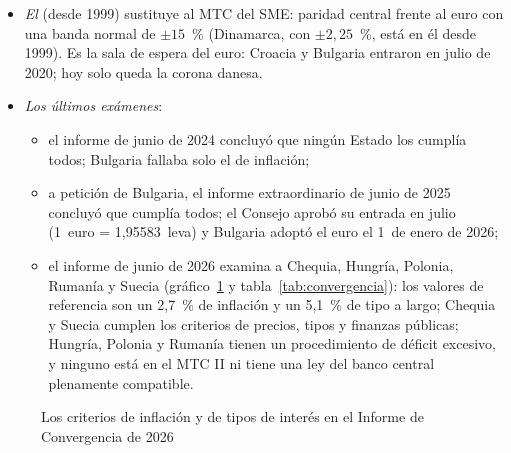 \documentclass[11pt]{article}
\begin{document}
\begin{itemize}
\item \emph{El } (desde 1999) sustituye al MTC del SME: paridad central frente al euro con una banda normal de $\pm15$~\% (Dinamarca, con $\pm2{,}25$~\%, está en él desde 1999). Es la sala de espera del euro: Croacia y Bulgaria entraron en julio de 2020; hoy solo queda la corona danesa\nocite{SuomenPankki2026MTC}.
\item \emph{Los últimos exámenes}\nocite{BCE2024Convergencia,BCE2025Convergencia,BCE2026Convergencia}:
  \begin{itemize}
  \item el informe de junio de 2024 concluyó que ningún Estado los cumplía todos; Bulgaria fallaba solo el de inflación\nocite{BCE2024Convergencia};
  \item a petición de Bulgaria, el informe extraordinario de junio de 2025 concluyó que cumplía todos; el Consejo aprobó su entrada en julio (1~euro = 1,95583~leva) y Bulgaria adoptó el euro el 1~de enero de 2026\nocite{UE2025DecisionBulgaria,UE2025ReglamentoBulgaria};
  \item el informe de junio de 2026 examina a Chequia, Hungría, Polonia, Rumanía y Suecia (gráfico~\ref{fig:convergencia} y tabla~\ref{tab:convergencia}): los valores de referencia son un 2,7~\% de inflación y un 5,1~\% de tipo a largo; Chequia y Suecia cumplen los criterios de precios, tipos y finanzas públicas; Hungría, Polonia y Rumanía tienen un procedimiento de déficit excesivo, y ninguno está en el MTC II ni tiene una ley del banco central plenamente compatible\nocite{BCE2026Convergencia}.
  \end{itemize}
\end{itemize}

\begin{figure}[H]
\centering
\caption{Los criterios de inflación y de tipos de interés en el Informe de Convergencia de 2026}\label{fig:convergencia}
\end{figure}
\end{document}
